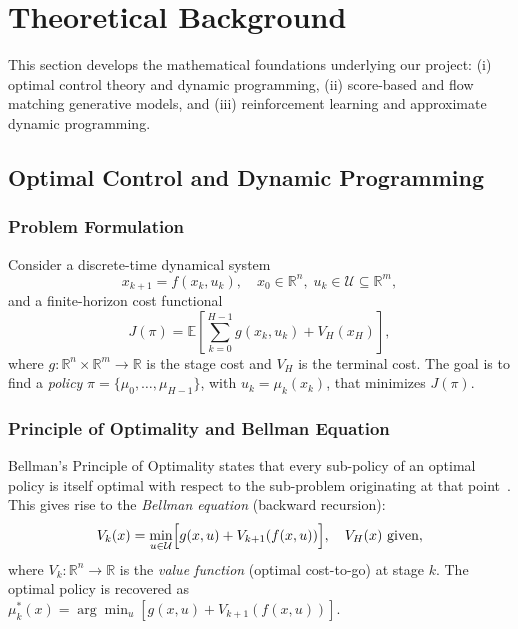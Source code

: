 \documentclass[letterpaper, 10pt, conference]{ieeeconf}
\newcommand{\R}{\mathbb{R}}
\newcommand{\E}{\mathbb{E}}
\begin{document}
\section{Theoretical Background}
\label{sec:theory}

This section develops the mathematical foundations underlying our project:
(i) optimal control theory and dynamic programming,
(ii) score-based and flow matching generative models, and
(iii) reinforcement learning and approximate dynamic programming.

\subsection{Optimal Control and Dynamic Programming}
\label{sec:oc}

\subsubsection{Problem Formulation}
Consider a discrete-time dynamical system
\begin{equation}
  x_{k+1} = f(x_k, u_k), \quad x_0 \in \R^n,\; u_k \in \mathcal{U} \subseteq \R^m,
  \label{eq:dynamics}
\end{equation}
and a finite-horizon cost functional
\begin{equation}
  J(\pi) = \E\!\left[\sum_{k=0}^{H-1} g(x_k, u_k) + V_H(x_H)\right],
  \label{eq:cost}
\end{equation}
where $g:\R^n\times\R^m\to\R$ is the stage cost and $V_H$ is the terminal cost.
The goal is to find a \emph{policy} $\pi = \{\mu_0,\ldots,\mu_{H-1}\}$, with
$u_k = \mu_k(x_k)$, that minimizes $J(\pi)$.

\subsubsection{Principle of Optimality and Bellman Equation}
Bellman's Principle of Optimality states that every sub-policy of an optimal
policy is itself optimal with respect to the sub-problem originating at that
point~\cite{bertsekas2012dp}.  This gives rise to the \emph{Bellman equation}
(backward recursion):
\begin{equation}
  V_k(x) = \min_{u \in \mathcal{U}}\Bigl[g(x,u) + V_{k+1}(f(x,u))\Bigr],\quad
  V_H(x) \text{ given},
  \label{eq:bellman}
\end{equation}
where $V_k:\R^n\to\R$ is the \emph{value function} (optimal cost-to-go) at
stage $k$.  The optimal policy is recovered as
$\mu_k^*(x) = \arg\min_{u}[g(x,u) + V_{k+1}(f(x,u))]$.
\end{document}
